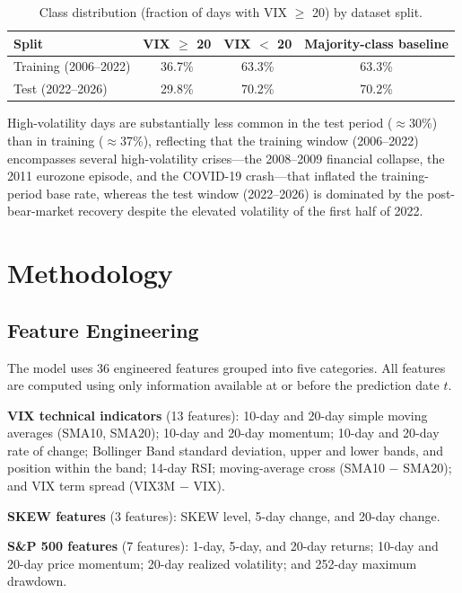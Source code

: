\documentclass[11pt]{article}
\begin{document}
\begin{table}[H]
\centering
\caption{Class distribution (fraction of days with VIX $\geq$ 20) by dataset split.}
\label{tab:class}
\begin{tabular}{lccc}
\toprule
Split & VIX $\geq$ 20 & VIX $<$ 20 & Majority-class baseline \\
\midrule
Training (2006--2022) & 36.7\% & 63.3\% & 63.3\% \\
Test (2022--2026)     & 29.8\% & 70.2\% & 70.2\% \\
\bottomrule
\end{tabular}
\end{table}

High-volatility days are substantially less common in the test period ($\approx$30\%) than in training ($\approx$37\%), reflecting that the training window (2006--2022) encompasses several high-volatility crises---the 2008--2009 financial collapse, the 2011 eurozone episode, and the COVID-19 crash---that inflated the training-period base rate, whereas the test window (2022--2026) is dominated by the post-bear-market recovery despite the elevated volatility of the first half of 2022.

\section{Methodology}
\label{sec:methodology}

\subsection{Feature Engineering}

The model uses 36 engineered features grouped into five categories. All features are computed using only information available at or before the prediction date $t$.

\textbf{VIX technical indicators} (13 features): 10-day and 20-day simple moving averages (SMA10, SMA20); 10-day and 20-day momentum; 10-day and 20-day rate of change; Bollinger Band standard deviation, upper and lower bands, and position within the band; 14-day RSI; moving-average cross (SMA10 $-$ SMA20); and VIX term spread (VIX3M $-$ VIX).

\textbf{SKEW features} (3 features): SKEW level, 5-day change, and 20-day change.

\textbf{S\&P 500 features} (7 features): 1-day, 5-day, and 20-day returns; 10-day and 20-day price momentum; 20-day realized volatility; and 252-day maximum drawdown.
\end{document}
